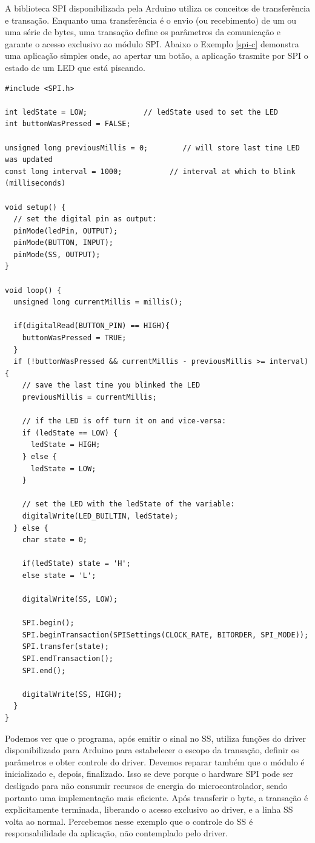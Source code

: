 \documentclass[11pt]{article}
\begin{document}
\par A biblioteca SPI disponibilizada pela Arduino utiliza os conceitos de transferência e transação. Enquanto uma transferência é o envio (ou recebimento) de um ou uma série de bytes, uma transação define os parâmetros da comunicação e garante o acesso exclusivo ao módulo SPI. Abaixo o Exemplo \ref{spi-c} demonstra uma aplicação simples onde, ao apertar um botão, a aplicação trasmite por SPI o estado de um LED que está piscando.
\begin{lstlisting}[style=CStyle,label=spi-c,caption=Aplicação em C utilizando driver SPI bloqueante]
#include <SPI.h>

int ledState = LOW;             // ledState used to set the LED
int buttonWasPressed = FALSE;

unsigned long previousMillis = 0;        // will store last time LED was updated
const long interval = 1000;           // interval at which to blink (milliseconds)

void setup() {
  // set the digital pin as output:
  pinMode(ledPin, OUTPUT);
  pinMode(BUTTON, INPUT);
  pinMode(SS, OUTPUT);
}

void loop() {
  unsigned long currentMillis = millis();

  if(digitalRead(BUTTON_PIN) == HIGH){
    buttonWasPressed = TRUE;
  }
  if (!buttonWasPressed && currentMillis - previousMillis >= interval) {
    // save the last time you blinked the LED
    previousMillis = currentMillis;

    // if the LED is off turn it on and vice-versa:
    if (ledState == LOW) {
      ledState = HIGH;
    } else {
      ledState = LOW;
    }

    // set the LED with the ledState of the variable:
    digitalWrite(LED_BUILTIN, ledState);
  } else {
    char state = 0;

    if(ledState) state = 'H';
    else state = 'L';

    digitalWrite(SS, LOW);

    SPI.begin();
    SPI.beginTransaction(SPISettings(CLOCK_RATE, BITORDER, SPI_MODE));
    SPI.transfer(state);
    SPI.endTransaction();
    SPI.end();

    digitalWrite(SS, HIGH);
  }
}
\end{lstlisting}
\par Podemos ver que o programa, após emitir o sinal no SS, utiliza funções do driver disponibilizado para Arduino para estabelecer o escopo da transação, definir os parâmetros e obter controle do driver. Devemos reparar também que o módulo é inicializado e, depois, finalizado. Isso se deve porque o hardware SPI pode ser desligado para não consumir recursos de energia do microcontrolador, sendo portanto uma implementação mais eficiente. Após transferir o byte, a transação é explicitamente terminada, liberando o acesso exclusivo ao driver, e a linha SS volta ao normal. Percebemos nesse exemplo que o controle do SS é responsabilidade da aplicação, não contemplado pelo driver.
\end{document}
